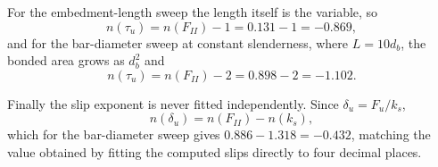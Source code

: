 For the embedment-length sweep the length itself is the variable, so
\begin{equation}
n(\tau_u) = n(F_{II}) - 1 = 0.131 - 1 = -0.869 ,
\end{equation}
and for the bar-diameter sweep at constant slenderness, where
$L = 10 d_b$, the bonded area grows as $d_b^2$ and
\begin{equation}
n(\tau_u) = n(F_{II}) - 2 = 0.898 - 2 = -1.102 .
\end{equation}

Finally the slip exponent is never fitted independently. Since
$\delta_u = F_u/k_s$,
\begin{equation}
\label{eq:slipexp}
n(\delta_u) = n(F_{II}) - n(k_s) ,
\end{equation}
which for the bar-diameter sweep gives
$0.886 - 1.318 = -0.432$, matching the value obtained by fitting the
computed slips directly to four decimal places.